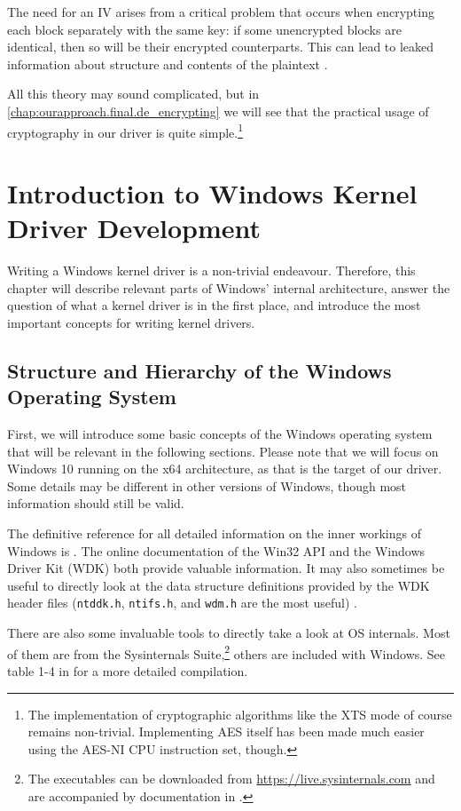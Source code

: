 The need for an IV arises from a critical problem that occurs when encrypting each block separately with the same key: if some unencrypted blocks are identical, then so will be their encrypted counterparts. This can lead to leaked information about structure and contents of the plaintext \cite{Ferguson2010}.

All this theory may sound complicated, but in \autoref{chap:ourapproach.final.de_encrypting} we will see that the practical usage of cryptography in our driver is quite simple.\footnote{\label{fn:background.luks2.simplecryptography} The implementation of cryptographic algorithms like the XTS mode of course remains non-trivial. Implementing AES itself has been made much easier using the AES-NI CPU instruction set, though.}

\section{Introduction to Windows Kernel Driver Development}
\label{chap:background.kerneldriver}
Writing a Windows kernel driver is a non-trivial endeavour. Therefore, this chapter will describe relevant parts of Windows' internal architecture, answer the question of what a kernel driver is in the first place, and introduce the most important concepts for writing kernel drivers.

\subsection{Structure and Hierarchy of the Windows Operating System}
\label{chap:background.kerneldriver.oshierarchy}
First, we will introduce some basic concepts of the Windows operating system that will be relevant in the following sections. Please note that we will focus on Windows 10 running on the x64 architecture, as that is the target of our driver. Some details may be different in other versions of Windows, though most information should still be valid.

The definitive reference for all detailed information on the inner workings of Windows is \cite{Yosifovich2017}. The online documentation of the Win32 API \cite{Win32} and the Windows Driver Kit (WDK) \cite{Wdk} both provide valuable information. It may also sometimes be useful to directly look at the data structure definitions provided by the WDK header files (\texttt{ntddk.h}, \texttt{ntifs.h}, and \texttt{wdm.h} are the most useful) \cite{Yosifovich2017}.

There are also some invaluable tools to directly take a look at OS internals. Most of them are from the Sysinternals Suite,\footnote{\label{fn:background.kerneldriver.sysinternals} The executables can be downloaded from \url{https://live.sysinternals.com} and are accompanied by documentation in \cite{Russinovich2016}.} others are included with Windows. See table 1-4 in \cite{Yosifovich2017} for a more detailed compilation.

